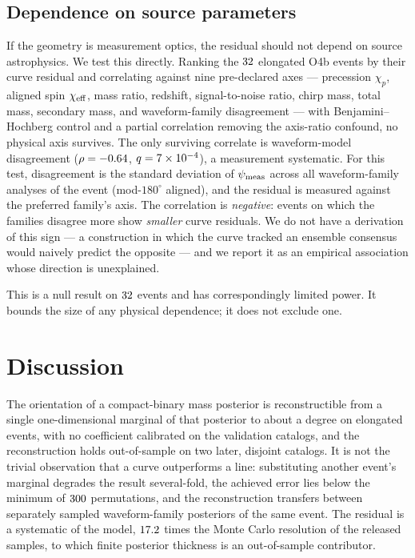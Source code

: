 \documentclass[aps,preprint,amsmath,amssymb,nofootinbib,superscriptaddress]{revtex4-2}
\begin{document}
\subsection{Dependence on source parameters}
\label{sec:atlas}
If the geometry is measurement optics, the residual should not depend on source astrophysics. We test this
directly. Ranking the $32$ elongated O4b events by their curve residual and correlating against nine
pre-declared axes --- precession $\chi_p$, aligned spin $\chi_{\rm eff}$, mass ratio, redshift,
signal-to-noise ratio, chirp mass, total mass, secondary mass, and waveform-family disagreement --- with
Benjamini--Hochberg control and a partial correlation removing the axis-ratio confound, no physical axis
survives. The only surviving correlate is waveform-model disagreement ($\rho=-0.64$,
$q=7\times10^{-4}$), a measurement systematic. For this test, disagreement is the standard deviation of
$\psi_{\rm meas}$ across all waveform-family analyses of the event (mod-$180^\circ$ aligned), and the
residual is measured against the preferred family's axis. The correlation is \emph{negative}: events on
which the families disagree more show \emph{smaller} curve residuals. We do not have a derivation of this
sign --- a construction in which the curve tracked an ensemble consensus would naively predict the
opposite --- and we report it as an empirical association whose direction is unexplained.

This is a null result on $32$ events and has correspondingly limited power. It bounds the size of any
physical dependence; it does not exclude one.

\section{Discussion}
\label{sec:discussion}
The orientation of a compact-binary mass posterior is reconstructible from a single one-dimensional
marginal of that posterior to about a degree on elongated events, with no coefficient calibrated on the
validation catalogs, and the reconstruction holds out-of-sample on two later, disjoint catalogs. It is not
the trivial observation that a curve outperforms a line: substituting another event's marginal degrades the
result several-fold, the achieved error lies below the minimum of $300$ permutations, and the
reconstruction transfers between separately sampled waveform-family posteriors of the same event. The
residual is a systematic of the model, $17.2$ times the Monte Carlo resolution of the released
samples, to which finite posterior thickness is an out-of-sample contributor.
\end{document}

